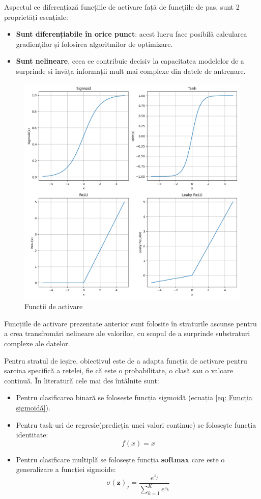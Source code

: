 Aspectul ce diferențiază funcțiile de activare față de funcțiile de pas, sunt 2 proprietăți esențiale:

\begin{itemize}
    \item \textbf{Sunt diferențiabile în orice punct}: acest lucru face posibilă calcularea gradienților și folosirea algoritmilor de optimizare.
    \item \textbf{Sunt nelineare}, ceea ce contribuie decisiv la capacitatea modelelor de a surprinde si învăța informații mult mai complexe din datele de antrenare.  
\end{itemize}



\newpage

\begin{figure}[h]
         \centering 
         \includegraphics[width=.6\linewidth]{images/activation_functions.png}
         \captionsetup{font=footnotesize}
         \caption{Funcții de activare}
\end{figure}

Funcțiile de activare prezentate anterior sunt folosite în straturile ascunse pentru a crea transfromări nelineare ale valorilor, cu scopul de a surprinde substraturi complexe ale datelor. 

Pentru stratul de ieșire, obiectivul este de a adapta funcția de activare pentru sarcina specifică a rețelei, fie că este o probabilitate, o clasă sau o valoare continuă. În literatură cele mai des întâlnite sunt: 

\begin{itemize}
    \item Pentru clasificarea binară se folosește funcția sigmoidă (ecuația \ref{eq: Funcția sigmoidă}). 
    \item Pentru task-uri de regresie(predicția unei valori continue) se folosește funcția identitate:
    \begin{equation}
        f(x) = x
        \label{}
    \end{equation}
    \item Pentru clasificare multiplă se folosește funcția \textbf{softmax} care este o generalizare a funcției sigmoide:
        \begin{equation}
        \sigma(\mathbf{z})_j = \frac{e^{z_j}}{\sum_{k=1}^K e^{z_k}}
        \label{}
    \end{equation}
\end{itemize}


